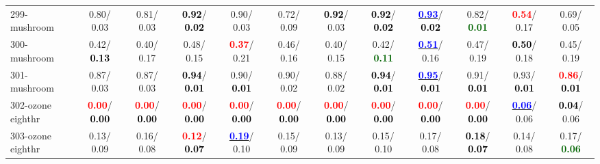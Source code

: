 \begin{table}[h]
\begin{center}
{\begin{tabular}{lc|c|c|c|c|c|c|c|c|c|c}
299-mushroom &   0.80/  0.03 &   0.81/  0.03 & \textcolor{black}{\textbf{  0.92}}/\textcolor{black}{\textbf{  0.02}} &   0.90/  0.03 &   0.72/  0.09 & \textcolor{black}{\textbf{  0.92}}/  0.03 & \textcolor{black}{\textbf{  0.92}}/\textcolor{black}{\textbf{  0.02}} & \underline{\textcolor{blue}{\textbf{  0.93}}}/\textcolor{black}{\textbf{  0.02}} &   0.82/\textcolor{darkgreen}{\textbf{  0.01}} & \textcolor{red}{\textbf{  0.54}}/  0.17 &   0.69/  0.05 \\
300-mushroom &   0.42/\textcolor{black}{\textbf{  0.13}} &   0.40/  0.17 &   0.48/  0.15 & \textcolor{red}{\textbf{  0.37}}/  0.21 &   0.46/  0.16 &   0.40/  0.15 &   0.42/\textcolor{darkgreen}{\textbf{  0.11}} & \underline{\textcolor{blue}{\textbf{  0.51}}}/  0.16 &   0.47/  0.19 & \textcolor{black}{\textbf{  0.50}}/  0.18 &   0.45/  0.19 \\
301-mushroom &   0.87/  0.03 &   0.87/  0.03 & \textcolor{black}{\textbf{  0.94}}/\textcolor{black}{\textbf{  0.01}} &   0.90/\textcolor{black}{\textbf{  0.01}} &   0.90/  0.02 &   0.88/  0.02 & \textcolor{black}{\textbf{  0.94}}/\textcolor{black}{\textbf{  0.01}} & \underline{\textcolor{blue}{\textbf{  0.95}}}/\textcolor{black}{\textbf{  0.01}} &   0.91/\textcolor{black}{\textbf{  0.01}} &   0.93/\textcolor{black}{\textbf{  0.01}} & \textcolor{red}{\textbf{  0.86}}/\textcolor{black}{\textbf{  0.01}} \\
302-ozone eighthr & \textcolor{red}{\textbf{  0.00}}/\textcolor{black}{\textbf{  0.00}} & \textcolor{red}{\textbf{  0.00}}/\textcolor{black}{\textbf{  0.00}} & \textcolor{red}{\textbf{  0.00}}/\textcolor{black}{\textbf{  0.00}} & \textcolor{red}{\textbf{  0.00}}/\textcolor{black}{\textbf{  0.00}} & \textcolor{red}{\textbf{  0.00}}/\textcolor{black}{\textbf{  0.00}} & \textcolor{red}{\textbf{  0.00}}/\textcolor{black}{\textbf{  0.00}} & \textcolor{red}{\textbf{  0.00}}/\textcolor{black}{\textbf{  0.00}} & \textcolor{red}{\textbf{  0.00}}/\textcolor{black}{\textbf{  0.00}} & \textcolor{red}{\textbf{  0.00}}/\textcolor{black}{\textbf{  0.00}} & \underline{\textcolor{blue}{\textbf{  0.06}}}/  0.06 & \textcolor{black}{\textbf{  0.04}}/  0.06 \\ \hline
303-ozone eighthr &   0.13/  0.09 &   0.16/  0.08 & \textcolor{red}{\textbf{  0.12}}/\textcolor{black}{\textbf{  0.07}} & \underline{\textcolor{blue}{\textbf{  0.19}}}/  0.10 &   0.15/  0.09 &   0.13/  0.09 &   0.15/  0.10 &   0.17/  0.08 & \textcolor{black}{\textbf{  0.18}}/\textcolor{black}{\textbf{  0.07}} &   0.14/  0.08 &   0.17/\textcolor{darkgreen}{\textbf{  0.06}} \\

\end{tabular}}
\end{center}
\end{table}
